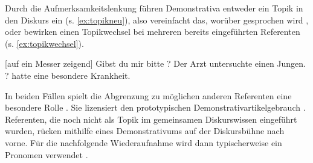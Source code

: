 \noindent
Durch die Aufmerksamkeitslenkung führen Demonstrativa  entweder ein Topik  in den Diskurs ein (s. \ref{ex:topikneu}), also vereinfacht das, worüber gesprochen wird \parencite{Jacobs2001}, oder bewirken einen Topikwechsel  bei mehreren bereits eingeführten Referenten (s. \ref{ex:topikwechsel}). 

\begin{exe}
	\ex 
	\begin{xlist} \label{ex:proto-dem}
		\ex \label{ex:topikneu} [auf ein Messer zeigend] Gibst du mir bitte ?
		\ex \label{ex:topikwechsel} Der Arzt untersuchte einen Jungen.\\ ? hatte eine besondere Krankheit.  
		\end{xlist}
\end{exe}

\noindent
In beiden Fällen spielt die Abgrenzung zu möglichen anderen Referenten eine besondere Rolle \parencite[80]{Bisle-Muller1991}. Sie lizensiert den prototypischen Demonstrativartikelgebrauch  \parencite[s. auch][]{Schlachter2015}. Referenten, die noch nicht als Topik  im gemeinsamen Diskurswissen eingeführt wurden, rücken mithilfe eines Demonstrativums  auf der Diskursbühne nach vorne. Für die nachfolgende Wiederaufnahme wird dann typischerweise ein Pronomen verwendet \parencite[297]{Gundel1993}. 

